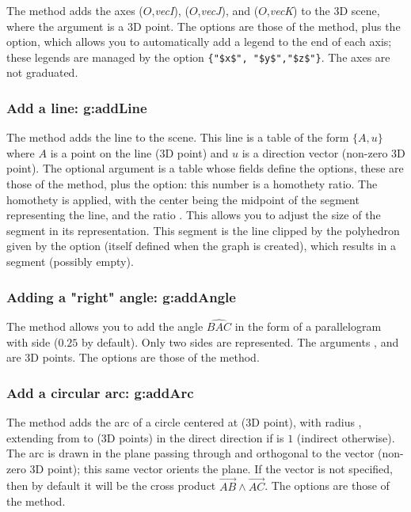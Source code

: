 The  method adds the axes ($O$,\emph{vecI}), ($O$,\emph{vecJ}), and ($O$,\emph{vecK}) to the 3D scene, where the argument  is a 3D point. The options are those of the  method, plus the  option, which allows you to automatically add a legend to the end of each axis; these legends are managed by the option \verb|{"$x$", "$y$","$z$"}|. The axes are not graduated.

    
\subsubsection{Add a line: g:addLine}

The  method adds the line  to the scene. This line is a table of the form $\{A,u\}$ where $A$ is a point on the line (3D point) and $u$ is a direction vector (non-zero 3D point). The optional argument  is a table whose fields define the options, these are those of the  method, plus the  option: this number is a homothety ratio. The homothety is applied, with the center being the midpoint of the segment representing the line, and the ratio . This allows you to adjust the size of the segment in its representation. This segment is the line clipped by the polyhedron given by the  option (itself defined when the graph is created), which results in a segment (possibly empty).

\subsubsection{Adding a "right" angle: g:addAngle}

The  method allows you to add the angle $\widehat{BAC}$ in the form of a parallelogram with side  ($0.25$ by default). Only two sides are represented. The arguments ,  and  are 3D points. The options are those of the  method.

\subsubsection{Add a circular arc: g:addArc}

The  method adds the arc of a circle centered at  (3D point), with radius , extending from  to  (3D points) in the direct direction if  is $1$ (indirect otherwise). The arc is drawn in the plane passing through  and orthogonal to the  vector (non-zero 3D point); this same vector orients the plane. If the vector  is not specified, then by default it will be the cross product $\vec{AB}\wedge\vec{AC}$. The options are those of the  method.

